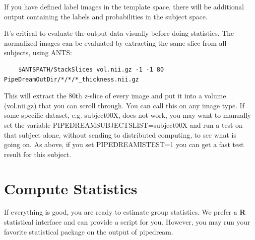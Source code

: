 \documentclass{InsightArticle}
\begin{document}
If you have defined label images in the template space, there will be additional output containing the labels and probabilities in the subject space.

It's critical to evaluate the output data visually before doing statistics. The normalized images can be evaluated by extracting the same slice from all subjects, using ANTS:
\begin{verbatim}
    $ANTSPATH/StackSlices vol.nii.gz -1 -1 80  PipeDreamOutDir/*/*/*_thickness.nii.gz
\end{verbatim}
This will extract the 80th z-slice of every image and put it into a volume (vol.nii.gz) 
that you can scroll through.  You can call this on any image type.  If some specific dataset, e.g. subject00X, does not work, you 
may want to manually set the variable PIPEDREAMSUBJECTSLIST=subject00X and run a test 
on that subject alone, without sending to distributed computing, to see what is going on.  As above, if you 
set PIPEDREAMISTEST=1 you can get a fast test result for this subject.  

\section{Compute Statistics} 
If everything is good, you are ready to estimate group statistics.  We
prefer a {\bf R} statistical interface and can provide a script for
you.  However, you may run your favorite statistical package on the
output of pipedream.
\end{document}

